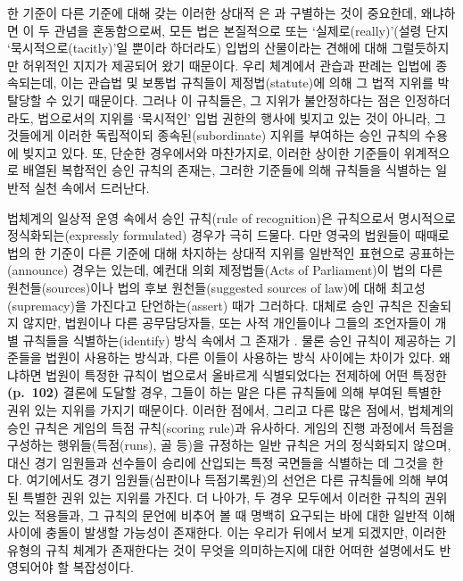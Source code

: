 한 기준이 다른 기준에 대해 갖는 이러한 상대적
은 과 구별하는 것이
중요한데, 왜냐하면 이 두 관념을 혼동함으로써, 모든 법은 본질적으로 또는
‘실제로(really)’(설령 단지 ‘묵시적으로(tacitly)’일 뿐이라 하더라도)
입법의 산물이라는 견해에 대해 그럴듯하지만 허위적인 지지가 제공되어 왔기
때문이다. 우리 체계에서 관습과 판례는 입법에 종속되는데, 이는 관습법 및
보통법 규칙들이 제정법(statute)에 의해 그 법적 지위를 박탈당할 수 있기
때문이다. 그러나 이 규칙들은, 그 지위가 불안정하다는 점은 인정하더라도,
법으로서의 지위를 ‘묵시적인’ 입법 권한의 행사에 빚지고 있는 것이 아니라,
그것들에게 이러한 독립적이되 종속된(subordinate) 지위를 부여하는 승인
규칙의 수용에 빚지고 있다. 또, 단순한 경우에서와 마찬가지로, 이러한
상이한 기준들이 위계적으로 배열된 복합적인 승인 규칙의 존재는, 그러한
기준들에 의해 규칙들을 식별하는 일반적 실천 속에서 드러난다.

법체계의 일상적 운영 속에서 승인 규칙(rule of recognition)은 규칙으로서
명시적으로 정식화되는(expressly formulated) 경우가 극히 드물다. 다만
영국의 법원들이 때때로 법의 한 기준이 다른 기준에 대해 차지하는 상대적
지위를 일반적인 표현으로 공표하는(announce) 경우는 있는데, 예컨대 의회
제정법들(Acts of Parliament)이 법의 다른 원천들(sources)이나 법의 후보
원천들(suggested sources of law)에 대해 최고성(supremacy)을 가진다고
단언하는(assert) 때가 그러하다. 대체로 승인 규칙은 진술되지 않지만,
법원이나 다른 공무담당자들, 또는 사적 개인들이나 그들의 조언자들이 개별
규칙들을 식별하는(identify) 방식 속에서 그 존재가
. 물론 승인 규칙이 제공하는 기준들을 법원이
사용하는 방식과, 다른 이들이 사용하는 방식 사이에는 차이가 있다.
왜냐하면 법원이 특정한 규칙이 법으로서 올바르게 식별되었다는 전제하에
어떤 특정한 \textbf{(p.~102)} 결론에 도달할 경우, 그들이 하는 말은 다른
규칙들에 의해 부여된 특별한 권위 있는 지위를 가지기 때문이다. 이러한
점에서, 그리고 다른 많은 점에서, 법체계의 승인 규칙은 게임의 득점
규칙(scoring rule)과 유사하다. 게임의 진행 과정에서 득점을 구성하는
행위들(득점(runs), 골 등)을 규정하는 일반 규칙은 거의 정식화되지 않으며,
대신 경기 임원들과 선수들이 승리에 산입되는 특정 국면들을 식별하는 데
그것을 한다. 여기에서도 경기 임원들(심판이나
득점기록원)의 선언은 다른 규칙들에 의해 부여된 특별한 권위 있는 지위를
가진다. 더 나아가, 두 경우 모두에서 이러한 규칙의 권위 있는 적용들과, 그
규칙의 문언에 비추어 볼 때 명백히 요구되는 바에 대한 일반적 이해 사이에
충돌이 발생할 가능성이 존재한다. 이는 우리가 뒤에서 보게 되겠지만,
이러한 유형의 규칙 체계가 존재한다는 것이 무엇을 의미하는지에 대한
어떠한 설명에서도 반영되어야 할 복잡성이다.

